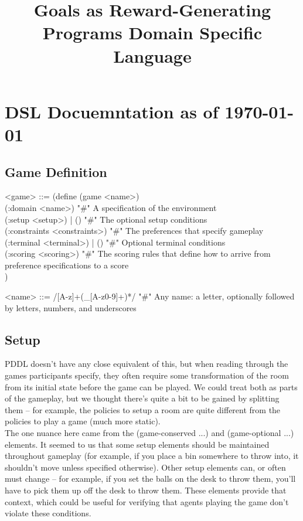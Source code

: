 \documentclass{article}
\title{Goals as Reward-Generating Programs Domain Specific Language}
\begin{document}
\maketitle

\section{DSL Docuemntation as of \today}

\subsection{Game Definition}
\begin{grammar}
<game> ::= (define (game <name>) \\
  (:domain <name>) "#" A specification of the environment  \\
  (:setup <setup>) | () "#" The optional setup conditions \\
  (:constraints <constraints>) "#" The preferences that specify gameplay \\
  (:terminal <terminal>) | () "#" Optional terminal conditions \\
  (:scoring <scoring>) "#" The scoring rules that define how to arrive from preference specifications to a score \\)

<name> ::= /[A-z]+(_[A-z0-9]+)*/ "#" Any name: a letter, optionally followed by letters, numbers, and underscores
\end{grammar}

\subsection{Setup}
PDDL doesn't have any close equivalent of this, but when reading through the games participants specify, 
        they often require some transformation of the room from its initial state before the game can be played.
        We could treat both as parts of the gameplay, but we thought there's quite a bit to be gained by splitting them -- for example,
        the policies to setup a room are quite different from the policies to play a game (much more static). \\

        The one nuance here came from the (game-conserved ...) and (game-optional ...) elements. It seemed to us that some setup elements should be maintained
        throughout gameplay (for example, if you place a bin somewhere to throw into, it shouldn't move unless specified otherwise).
        Other setup elements can, or often must change -- for example, if you set the balls on the desk to throw them, you'll have to pick them up off the desk to throw them.
        These elements provide that context, which could be useful for verifying that agents playing the game don't violate these conditions.
        
\end{document}
